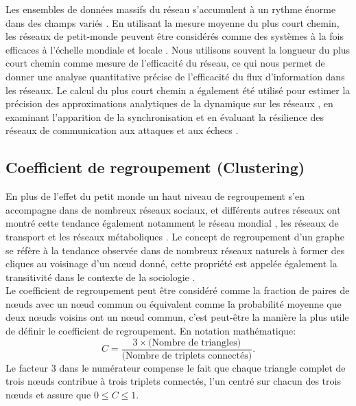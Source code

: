    Les ensembles de données massifs du réseau s'accumulent à un rythme énorme dans des champs variés \cite{Qi-al2010}. En utilisant la mesure moyenne du plus court chemin, les réseaux de petit-monde peuvent être considérés comme des systèmes à la fois efficaces à l'échelle mondiale et locale \cite{Latora-Marchiori2001}. Nous utilisons souvent la longueur du plus court chemin comme mesure de l'efficacité du réseau, ce qui nous permet de donner une analyse quantitative précise de l'efficacité du flux d'information dans les réseaux. Le calcul du plus court chemin a également été utilisé pour estimer la précision des approximations analytiques de la dynamique sur les réseaux \cite{Melnik-al2011}, en examinant l'apparition de la synchronisation \cite{Zhao-al2006} et en évaluant la résilience des réseaux de communication aux attaques et aux échecs \cite{Albert-al2000}.
   
   \subsection{Coefficient de regroupement (Clustering)}
   En plus de l'effet du petit monde un haut niveau de regroupement s'en accompagne dans de nombreux
   réseaux sociaux, et différents autres réseaux ont montré cette tendance également notamment le réseau mondial \cite{Lad1999}, les réseaux de transport \cite{Seb-al2022} et les réseaux métaboliques \cite{WD2000,SC2001}.
   Le concept de regroupement d'un graphe
   se réfère à la tendance observée dans de nombreux réseaux naturels à former des cliques au voisinage d'un nœud donné, 
   cette propriété est appelée également la transitivité dans le contexte de la sociologie \cite{Wa1994}.\\
   Le coefficient de regroupement peut être considéré comme la fraction de paires de nœuds avec un nœud commun
   ou équivalent comme la probabilité moyenne que deux nœuds voisins ont un nœud commun, c'est peut-\^{e}tre la manière
   la plus utile de définir le coefficient de regroupement. En notation mathématique:
    \begin{equation}
    C=\frac{3\times\text{(Nombre de triangles)}}{\text{(Nombre de triplets connectés)}}
    \label{Clustering}.
   \end{equation}
   Le facteur $3$ dans le numérateur compense le fait que chaque triangle complet de trois nœuds contribue à trois triplets
   connectés, l'un centré sur chacun des trois nœuds et assure que $0\leq C\leq 1$.
 
